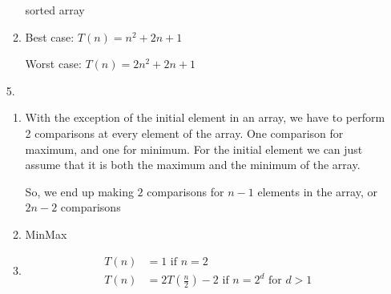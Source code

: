 \documentclass[12pt,letterpaper]{article}
\begin{document}
\begin{enumerate}
\begin{enumerate}
\begin{algorithm}[H]
            \KwRet sorted array
          \end{algorithm}
        \item
          Best case: $T(n) = n^2 + 2n + 1$

          Worst case: $T(n) = 2n^2 + 2n + 1$
      \end{enumerate}

    \item[5.]
      \begin{enumerate}
        \item
          With the exception of the initial element in an array, we have to perform 2 comparisons at every element of the array.
          One comparison for maximum, and one for minimum.
          For the initial element we can just assume that it is both the maximum and the minimum of the array.

          So, we end up making $2$ comparisons for $n-1$ elements in the array, or $2n - 2$ comparisons

        \item
          \begin{algorithm}[H]
            MinMax
            \BlankLine

          \end{algorithm}

        \item
          \begin{align*}
            T(n) &= 1 \text{ if } n = 2 \\
            T(n) &= 2T\left(\frac{n}{2}\right) - 2 \text{ if } n = 2^d \text{ for } d > 1
          \end{align*}
      \end{enumerate}
  \end{enumerate}
\end{document}

